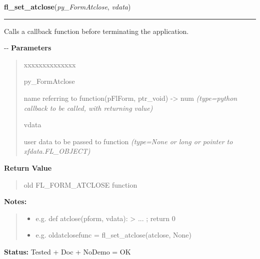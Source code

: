     \label{xformslib:flbasic:fl_set_atclose}

    \vspace{0.5ex}

\hspace{.8\funcindent}\begin{boxedminipage}{\funcwidth}

    \raggedright \textbf{fl\_set\_atclose}(\textit{py\_FormAtclose}, \textit{vdata})

    \vspace{-1.5ex}

    \rule{\textwidth}{0.5\fboxrule}
\setlength{\parskip}{2ex}

Calls a callback function before terminating the application.

-{}-
\setlength{\parskip}{1ex}
      \textbf{Parameters}
      \vspace{-1ex}

      \begin{quote}
        \begin{Ventry}{xxxxxxxxxxxxxx}

          \item[py\_FormAtclose]


name referring to function(pFlForm, ptr\_void) -> num
            {\it (type=python callback to be called, with returning value)}

          \item[vdata]


user data to be passed to function
            {\it (type=None or long or pointer to xfdata.FL\_OBJECT)}

        \end{Ventry}

      \end{quote}

      \textbf{Return Value}
    \vspace{-1ex}

      \begin{quote}

old FL\_FORM\_ATCLOSE function
      \end{quote}

\textbf{Notes:}
\begin{quote}
  \begin{itemize}

  \item
    \setlength{\parskip}{0.6ex}

e.g. def atclose(pform, vdata): > ... ; return 0


  \item 
e.g. oldatclosefunc = fl\_set\_atclose(atclose, None)


\end{itemize}

\end{quote}

\textbf{Status:} 
Tested + Doc + NoDemo = OK


    \end{boxedminipage}

